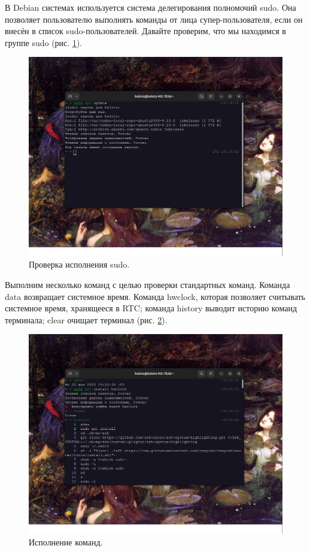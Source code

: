 В Debian системах используется система делегирования полномочий sudo. Она позволяет пользователю выполнять команды от лица супер-пользователя, если он внесён в список sudo-пользователей. Давайте проверим, что мы находимся в группе sudo (рис. \ref{fig:sudocheck}).

\begin{figure}[h!]
    \centering
    \includegraphics[width=0.8\linewidth]{Pic/lab5/Снимок экрана от 2025-05-22 19-14-51.png}
    \caption{Проверка исполнения sudo.}
    \label{fig:sudocheck}
\end{figure}

Выполним несколько команд с целью проверки стандартных команд. Команда data возвращает системное время. Команда hwclock, которая позволяет считывать системное время, хранящееся в RTC; команда history выводит историю команд терминала; clear очищает терминал (рис. \ref{fig:date}). 

\begin{figure}[h!]
    \centering
    \includegraphics[width=0.8\linewidth]{Pic/lab5/Снимок экрана от 2025-05-22 19-21-05.png}
    \caption{Исполнение команд.}
    \label{fig:date}
\end{figure}

